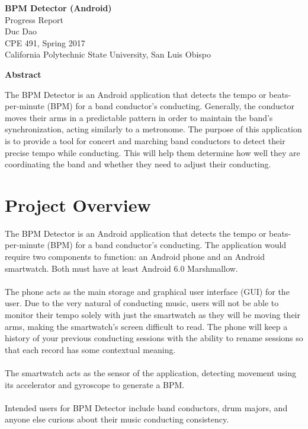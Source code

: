 \documentclass[12pt]{article}
\begin{document}
\begin{center}
  \vspace*{1in}
  \textbf{\LARGE{BPM Detector (Android)}} \\
  \large{Progress Report \\
  Duc Dao \\
  CPE 491, Spring 2017 \\
  California Polytechnic State University, San Luis Obispo} \\
\end{center}

\begin{center}
  \vspace*{2in}
  \textbf{Abstract} \\
\end{center}
The BPM Detector is an Android application that detects the tempo or beats-per-minute (BPM) for a band conductor's conducting. Generally, the conductor moves their arms in a predictable pattern in order to maintain the band's synchronization, acting similarly to a metronome. The purpose of this application is to provide a tool for concert and marching band conductors to detect their precise tempo while conducting. This will help them determine how well they are coordinating the band and whether they need to adjust their conducting.  

\newpage

\tableofcontents

\newpage

\section{Project Overview}

The BPM Detector is an Android application that detects the tempo or beats-per-minute (BPM) for a band conductor's conducting. The application would require two components to function: an Android phone and an Android smartwatch. Both must have at least Android 6.0 Marshmallow.
\\
\\
The phone acts as the main storage and graphical user interface (GUI) for the user. Due to the very natural of conducting music, users will not be able to monitor their tempo solely with just the smartwatch as they will be moving their arms, making the smartwatch's screen difficult to read. The phone will keep a history of your previous conducting sessions with the ability to rename sessions so that each record has some contextual meaning.
\\
\\
The smartwatch acts as the sensor of the application, detecting movement using its accelerator and gyroscope to generate a BPM.
\\
\\
Intended users for BPM Detector include band conductors, drum majors, and anyone else curious about their music conducting consistency.
\end{document}
